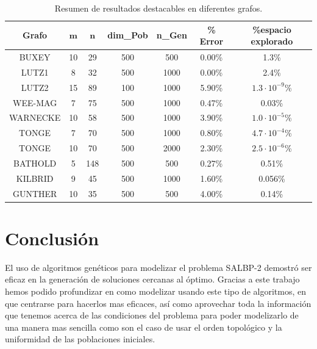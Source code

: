 \documentclass[12pt,a4paper]{report}
\begin{document}
\begin{table}[H]
    \centering
    
    \label{tab:otros-resultados}
    \begin{tabular}{|c|c|c|c|c|c|c|}
        \hline
        \textbf{Grafo} & $\mathbf{m}$ &$\mathbf{n}$& \textbf{dim\_Pob} & \textbf{n\_Gen} & \textbf{\% Error} & \textbf{\%espacio explorado} \\
        \hline
        BUXEY      & 10 &29& 500 & 500  & 0.00\%  & 1.3\%\\
        LUTZ1      & 8  &32& 500 & 1000 & 0.00\%  & 2.4\%\\
        LUTZ2      & 15 &89& 100 & 1000 & 5.90\%  & $1.3 \cdot 10^{-9}$\% \\
        WEE-MAG    & 7  &75& 500 & 1000 & 0.47\%  & 0.03\% \\
        WARNECKE   & 10 &58& 500 & 1000 & 3.90\%  & $1.0 \cdot 10^{-5}$\%\\
        TONGE      & 7  &70& 500 & 1000 & 0.80\%  & $4.7 \cdot 10^{-4}$\% \\
        TONGE      & 10 &70& 500 & 2000 & 2.30\%  & $2.5 \cdot 10^{-6}$\% \\
        BATHOLD    & 5  &148& 500 & 500  & 0.27\%  & 0.51\% \\
        KILBRID    & 9  &45& 500 & 1000 & 1.60\%  & 0.056\% \\
        GUNTHER    & 10 &35& 500 & 500  & 4.00\%  & 0.14\% \\
        \hline
    \end{tabular}
    \caption{Resumen de resultados destacables en diferentes grafos.}
\end{table}

\section{Conclusión}

El uso de algoritmos genéticos para modelizar el problema SALBP-2 demostró ser eficaz en la generación de soluciones cercanas al óptimo. Gracias a este trabajo hemos podido profundizar en como modelizar usando este tipo de algoritmos, en que centrarse para hacerlos mas eficaces, así como aprovechar toda la información que tenemos acerca de las condiciones del problema para poder modelizarlo de una manera mas sencilla como son el caso de usar el orden topológico y la uniformidad de las poblaciones iniciales.
\end{document}
